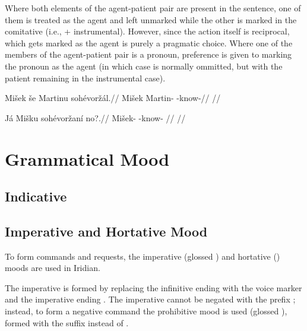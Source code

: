 Where both elements of the agent-patient pair are present in the sentence, one of them is treated as the agent and left unmarked while the other is marked in the comitative (i.e.,  + instrumental). However, since the action itself is reciprocal, which gets marked as the agent is purely a pragmatic choice. Where one of the members of the agent-patient pair is a pronoun, preference is given to marking the pronoun as the agent (in which case  is normally ommitted, but with the patient remaining in the instrumental case).

\pex
\begingl
\gla Mišek še Martinu sohévoržál.//
\glb Mišek  Martin- -know-//
\glft {}//
\endgl
\xe

\pex
\begingl
\gla Já Mišku sohévoržaní no?.//
\glb {} Mišek- -know- //
\glft {}//
\endgl
\xe



\section{Grammatical Mood}

\subsection{Indicative}

\subsection{Imperative and Hortative Mood}\label{sec:imp-hort}

To form commands and requests, the imperative (glossed ) and hortative () moods are used in Iridian.

The imperative is formed by replacing the infinitive ending  with the voice marker and the imperative ending . The imperative cannot be negated with the prefix ; instead, to form a negative command the prohibitive mood is used (glossed ), formed with the suffix  instead of .

